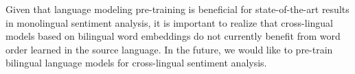 \documentclass[a4paper,11pt,twocolumn,twoside]{article}
\begin{document}
Given that language modeling pre-training is beneficial for state-of-the-art results in monolingual sentiment analysis, it is important to realize that cross-lingual models based on bilingual word embeddings do not currently benefit from word order learned in the source language. In the future, we would like to pre-train bilingual language models for cross-lingual sentiment analysis.





\end{document}
